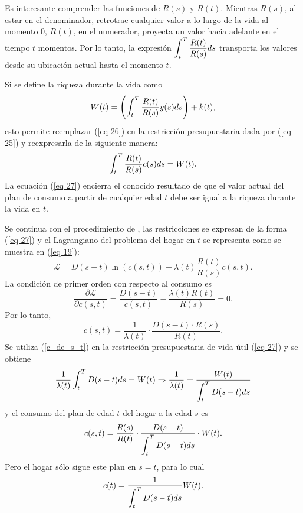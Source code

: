 Es interesante comprender las funciones de $R(s)$ y $R(t)$. Mientras $R(s)$, al estar en el denominador, retrotrae cualquier valor a lo largo de la vida al momento $0$, $R(t)$, en el numerador, proyecta un valor hacia adelante en el tiempo $t$ momentos. Por lo tanto, la expresión $ \displaystyle \int_t^T \dfrac{R(t)}{R(s)}ds$ transporta los valores desde su ubicación actual hasta el momento $t$.

Si se define la riqueza durante la vida como
\begin{equation}
\label{eq 26}
    W(t)= \left( \displaystyle \int_t^T \dfrac{R(t)}{R(s)} y(s) ds \right) + k(t),
\end{equation}
esto permite reemplazar (\ref{eq 26}) en la restricción presupuestaria dada por (\ref{eq 25}) y reexpresarla de la siguiente manera:
\begin{equation}
\label{eq 27}
     \displaystyle \int_t^T \dfrac{R(t)}{R(s)} c(s) ds = W(t).
\end{equation}
La ecuación (\ref{eq 27}) encierra el conocido resultado de que el valor actual del plan de consumo a partir de cualquier edad $t$ debe ser igual a la riqueza durante la vida en $t$.

Se continua con el procedimiento de \parencite{feigenbaum2021deviation}, las restricciones se expresan de la forma (\ref{eq 27}) y el Lagrangiano del problema del hogar en $t$ se representa como se muestra en (\ref{eq 19}): 
$$\mathcal{L} = D(s-t) \ln(c(s,t)) - \lambda(t) \dfrac{R(t)}{R(s)} c(s,t).$$
%
\noindent La condición de primer orden con respecto al consumo es
$$\dfrac{\partial \mathcal{L} }{\partial c(s,t)} = \dfrac{D(s-t)}{c(s,t)}- \dfrac{\lambda(t) R(t)}{R(s)}=0.$$
%
Por lo tanto,
\begin{equation}
\label{c_de_s_t}
    c(s,t)= \dfrac{1}{\lambda(t)} \cdot \dfrac{D(s-t) \cdot R(s)}{R(t)}.
\end{equation}
%
\noindent Se utiliza (\ref{c_de_s_t}) en la restricción presupuestaria de vida útil (\ref{eq 27}) y se obtiene
$$\dfrac{1}{\lambda(t)} \displaystyle \int_t^T D(s-t) ds = W(t) \Rightarrow
\displaystyle \dfrac{1}{\lambda(t)}  = \dfrac{W(t)}{ \displaystyle \int_t^T D(s-t) ds}$$
\noindent y el consumo del plan de edad $t$ del hogar a la edad $s$ es
\begin{equation}
\label{eq 28}
    c(s,t) = \dfrac{R(s)}{R(t)} \cdot \dfrac{D(s-t)}{\displaystyle \int_t^T D(s-t) ds} \cdot W(t).
\end{equation}
\noindent Pero el hogar sólo sigue este plan en $s = t$, para lo cual
\begin{equation}
\label{eq 29}
    c(t)=\dfrac{1}{\displaystyle \int_t^T D(s-t) ds}W(t).
\end{equation}

